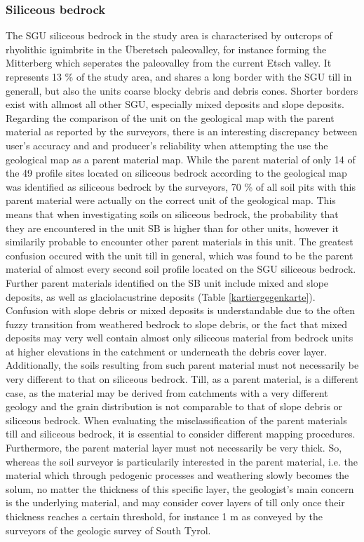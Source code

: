 \documentclass[preprint,12pt,authoryear]{elsarticle}
\begin{document}
\subsubsection{Siliceous bedrock}
The SGU siliceous bedrock in the study area is characterised by outcrops of rhyolithic ignimbrite in the {\"U}beretsch paleovalley, for instance forming the Mitterberg which seperates the paleovalley from the current Etsch valley. It represents 13 \% of the study area, and shares a long border with the SGU till in generall, but also the units coarse blocky debris and debris cones. Shorter borders exist with allmost all other SGU, especially mixed deposits and slope deposits. Regarding the comparison of the unit on the geological map with the parent material as reported by the surveyors, there is an interesting discrepancy between user's accuracy and and producer's reliability when attempting the use the geological map as a parent material map. While the parent material of only 14 of the 49 profile sites located on siliceous bedrock according to the geological map was identified as siliceous bedrock by the surveyors, 70 \% of all soil pits with this parent material were actually on the correct unit of the geological map. This means that when investigating soils on siliceous bedrock, the probability that they are encountered in the unit SB is higher than for other units, however it similarily probable to encounter other parent materials in this unit. The greatest confusion occured with the unit till in general, which was found to be the parent material of almost every second soil profile located on the SGU siliceous bedrock. Further parent materials identified on the SB unit include mixed and slope deposits, as well as glaciolacustrine deposits (Table \ref{kartiergegenkarte}). Confusion with slope debris or mixed deposits is understandable due to the often fuzzy transition from  weathered bedrock to slope debris, or the fact that mixed deposits may very well contain almost only siliceous material from bedrock units at higher elevations in the catchment or underneath the debris cover layer. Additionally, the soils resulting from such parent material must not necessarily be very different to that on siliceous bedrock. Till, as a parent material, is a different case, as the material may be derived from catchments with a very different geology and the grain distribution is not comparable to that of slope debris or siliceous bedrock. When evaluating the misclassification of the parent materials till and siliceous bedrock, it is essential to consider different mapping procedures. Furthermore, the parent material layer must not necessarily be very thick. So, whereas the soil surveyor is particularily interested in the parent material, i.e. the material which through  pedogenic processes and weathering slowly becomes the solum, no matter the thickness of this specific layer, the geologist's main concern is the underlying material, and may consider cover layers of till only once their thickness reaches a certain threshold, for instance 1 m as conveyed by the surveyors of the geologic survey of South Tyrol.
\end{document}
